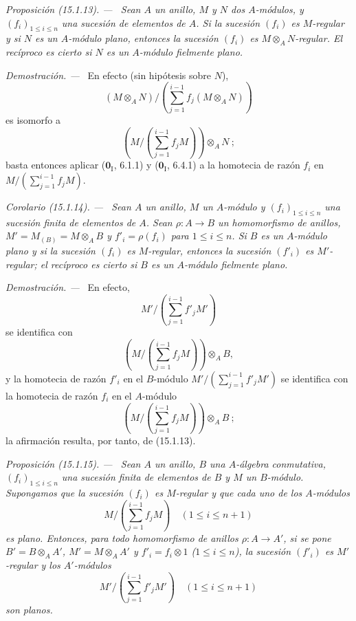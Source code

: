 \documentclass[10pt,oneside]{book}
\makeatletter
\newcommand{\setmanualcurrentlabel}[1]{\def\@currentlabel{#1}}
\newenvironment{proposition}[1][]{%
  \setmanualcurrentlabel{#1}\par\medskip\noindent\itshape Proposición (#1). ---\ }{\par}
\newenvironment{corollary}[1][]{%
  \setmanualcurrentlabel{#1}\par\medskip\noindent\itshape Corolario (#1). ---\ }{\par}
\newenvironment{proof}{%
  \par\medskip\noindent\textit{Demostración. ---\ }}{\par}
\makeatother
\begin{document}
\begin{proposition}[15.1.13]
\label{0.15.1.13-es}
Sean $A$ un anillo, $M$ y $N$ dos $A$-módulos, y
$(f_i)_{1\leq i\leq n}$ una sucesión de elementos de $A$. Si la sucesión
$(f_i)$ es $M$-regular y si $N$ es un $A$-módulo plano, entonces la sucesión
$(f_i)$ es $M\otimes_A N$-regular. El recíproco es cierto si $N$ es un
$A$-módulo fielmente plano.
\end{proposition}

\begin{proof}
En efecto (sin hipótesis sobre $N$),
\[
  (M\otimes_A N)/
  \left(\sum_{j=1}^{i-1}f_j(M\otimes_A N)\right)
\]
es isomorfo a
\[
  \left(M/\left(\sum_{j=1}^{i-1}f_jM\right)\right)\otimes_A N~;
\]
basta entonces aplicar ($\mathbf{0}_{\mathrm I}$, 6.1.1) y
($\mathbf{0}_{\mathrm I}$, 6.4.1) a la homotecia de razón $f_i$ en
$M/(\sum_{j=1}^{i-1}f_jM)$.
\end{proof}

\begin{corollary}[15.1.14]
\label{0.15.1.14-es}
Sean $A$ un anillo, $M$ un $A$-módulo y $(f_i)_{1\leq i\leq n}$ una sucesión
finita de elementos de $A$. Sean $\rho:A\to B$ un homomorfismo de anillos,
$M'=M_{(B)}=M\otimes_A B$ y $f'_i=\rho(f_i)$ para $1\leq i\leq n$. Si $B$ es
un $A$-módulo plano y si la sucesión $(f_i)$ es $M$-regular, entonces la
sucesión $(f'_i)$ es $M'$-regular; el recíproco es cierto si $B$ es un
$A$-módulo fielmente plano.
\end{corollary}

\begin{proof}
En efecto,
\[
  M'/\left(\sum_{j=1}^{i-1}f'_jM'\right)
\]
se identifica con
\[
  \left(M/\left(\sum_{j=1}^{i-1}f_jM\right)\right)\otimes_A B,
\]
y la homotecia de razón $f'_i$ en el $B$-módulo
$M'/(\sum_{j=1}^{i-1}f'_jM')$ se identifica con la homotecia de razón $f_i$
en el $A$-módulo
\[
  \left(M/\left(\sum_{j=1}^{i-1}f_jM\right)\right)\otimes_A B~;
\]
la afirmación resulta, por tanto, de (15.1.13).
\end{proof}

\begin{proposition}[15.1.15]
\label{0.15.1.15-es}
Sean $A$ un anillo, $B$ una $A$-álgebra conmutativa,
$(f_i)_{1\leq i\leq n}$ una sucesión finita de elementos de $B$ y $M$ un
$B$-módulo. Supongamos que la sucesión $(f_i)$ es $M$-regular y que cada uno
de los $A$-módulos
\[
  M/\left(\sum_{j=1}^{i-1}f_jM\right)\quad(1\leq i\leq n+1)
\]
es plano. Entonces, para todo homomorfismo de anillos $\rho:A\to A'$, si se
pone $B'=B\otimes_A A'$, $M'=M\otimes_A A'$ y $f'_i=f_i\otimes1$
\textup{($1\leq i\leq n$)}, la sucesión $(f'_i)$ es $M'$-regular y los
$A'$-módulos
\[
  M'/\left(\sum_{j=1}^{i-1}f'_jM'\right)\quad(1\leq i\leq n+1)
\]
son planos.
\end{proposition}
\end{document}
